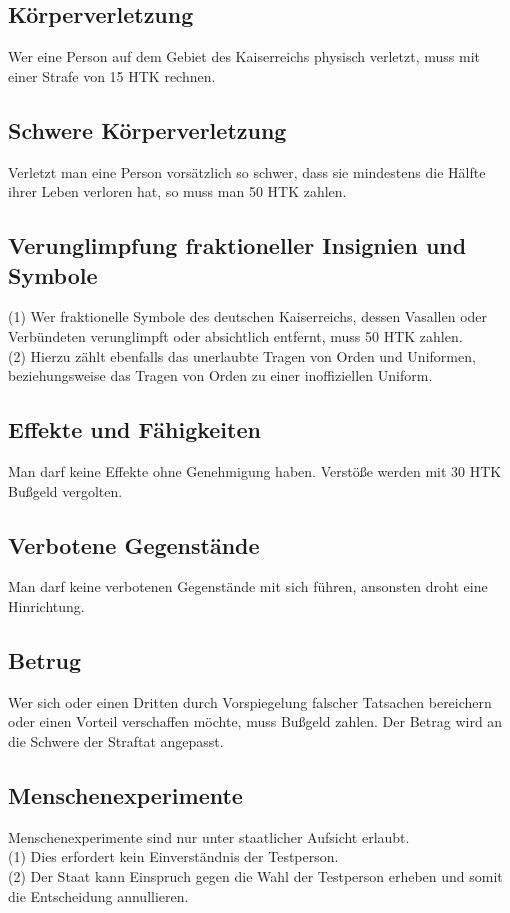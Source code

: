 \documentclass{article}
\begin{document}
\subsection{Körperverletzung}
Wer eine Person auf dem Gebiet des Kaiserreichs physisch verletzt, muss mit einer Strafe von 15 HTK rechnen.

\subsection{Schwere Körperverletzung}
Verletzt man eine Person vorsätzlich so schwer, dass sie mindestens die Hälfte ihrer Leben verloren hat, so muss man 50 HTK zahlen.

\subsection{Verunglimpfung fraktioneller Insignien und Symbole}
(1) Wer fraktionelle Symbole des deutschen Kaiserreichs, dessen Vasallen oder Verbündeten verunglimpft oder absichtlich entfernt, muss 50 HTK zahlen.\\
(2) Hierzu zählt ebenfalls das unerlaubte Tragen von Orden und Uniformen, beziehungsweise das Tragen von Orden zu einer inoffiziellen Uniform.

\subsection{Effekte und Fähigkeiten}
Man darf keine Effekte ohne Genehmigung haben. Verstöße werden mit 30 HTK Bußgeld vergolten.

\subsection{Verbotene Gegenstände}
Man darf keine verbotenen Gegenstände mit sich führen, ansonsten droht eine Hinrichtung.

\subsection{Betrug}
Wer sich oder einen Dritten durch Vorspiegelung falscher Tatsachen bereichern oder einen Vorteil verschaffen möchte, muss Bußgeld zahlen. Der Betrag wird an die Schwere der Straftat angepasst.

\subsection{Menschenexperimente}
Menschenexperimente sind nur unter staatlicher Aufsicht erlaubt.\\
(1) Dies erfordert kein Einverständnis der Testperson.\\
(2) Der Staat kann Einspruch gegen die Wahl der Testperson erheben und somit die Entscheidung annullieren.
\end{document}
